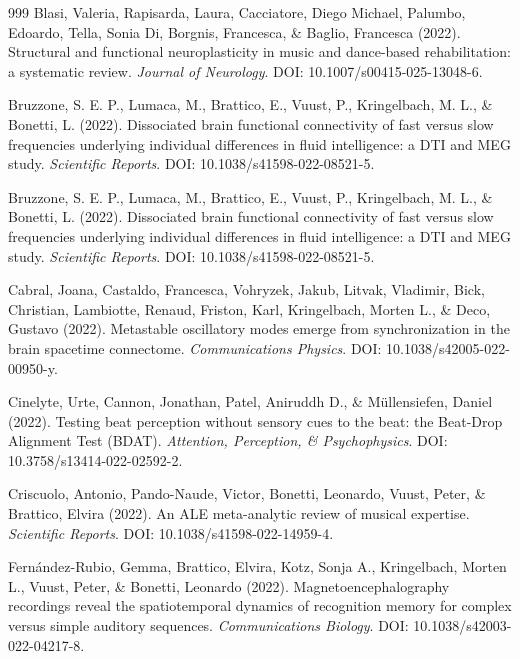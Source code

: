 \documentclass[9pt,onecolumn]{article}
\begin{document}
\begin{thebibliography}{999}
Blasi, Valeria, Rapisarda, Laura, Cacciatore, Diego Michael, Palumbo, Edoardo, Tella, Sonia Di, Borgnis, Francesca, \& Baglio, Francesca (2022). Structural and functional neuroplasticity in music and dance-based rehabilitation: a systematic review. \textit{Journal of Neurology}. DOI: 10.1007/s00415-025-13048-6.

Bruzzone, S. E. P., Lumaca, M., Brattico, E., Vuust, P., Kringelbach, M. L., \& Bonetti, L. (2022). Dissociated brain functional connectivity of fast versus slow frequencies underlying individual differences in fluid intelligence: a DTI and MEG study. \textit{Scientific Reports}. DOI: 10.1038/s41598-022-08521-5.

Bruzzone, S. E. P., Lumaca, M., Brattico, E., Vuust, P., Kringelbach, M. L., \& Bonetti, L. (2022). Dissociated brain functional connectivity of fast versus slow frequencies underlying individual differences in fluid intelligence: a DTI and MEG study. \textit{Scientific Reports}. DOI: 10.1038/s41598-022-08521-5.

Cabral, Joana, Castaldo, Francesca, Vohryzek, Jakub, Litvak, Vladimir, Bick, Christian, Lambiotte, Renaud, Friston, Karl, Kringelbach, Morten L., \& Deco, Gustavo (2022). Metastable oscillatory modes emerge from synchronization in the brain spacetime connectome. \textit{Communications Physics}. DOI: 10.1038/s42005-022-00950-y.

Cinelyte, Urte, Cannon, Jonathan, Patel, Aniruddh D., \& Müllensiefen, Daniel (2022). Testing beat perception without sensory cues to the beat: the Beat-Drop Alignment Test (BDAT). \textit{Attention, Perception, \& Psychophysics}. DOI: 10.3758/s13414-022-02592-2.

Criscuolo, Antonio, Pando-Naude, Victor, Bonetti, Leonardo, Vuust, Peter, \& Brattico, Elvira (2022). An ALE meta-analytic review of musical expertise. \textit{Scientific Reports}. DOI: 10.1038/s41598-022-14959-4.

Fernández-Rubio, Gemma, Brattico, Elvira, Kotz, Sonja A., Kringelbach, Morten L., Vuust, Peter, \& Bonetti, Leonardo (2022). Magnetoencephalography recordings reveal the spatiotemporal dynamics of recognition memory for complex versus simple auditory sequences. \textit{Communications Biology}. DOI: 10.1038/s42003-022-04217-8.


\end{thebibliography}
\end{document}
